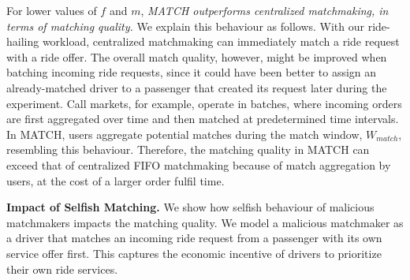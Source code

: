 For lower values of $ f $ and $ m $, \emph{MATCH outperforms centralized matchmaking, in terms of matching quality.}
We explain this behaviour as follows.
With our ride-hailing workload, centralized matchmaking can immediately match a ride request with a ride offer.
The overall match quality, however, might be improved when batching incoming ride requests, since it could have been better to assign an already-matched driver to a passenger that created its request later during the experiment.
Call markets, for example, operate in batches, where incoming orders are first aggregated over time and then matched at predetermined time intervals.
In MATCH, users aggregate potential matches during the match window, $ W_{match} $, resembling this behaviour.
Therefore, the matching quality in MATCH can exceed that of centralized FIFO matchmaking because of match aggregation by users, at the cost of a larger order fulfil time.

\textbf{Impact of Selfish Matching.}
We show how selfish behaviour of malicious matchmakers impacts the matching quality.
We model a malicious matchmaker as a driver that matches an incoming ride request from a passenger with its own service offer first.
This captures the economic incentive of drivers to prioritize their own ride services.

